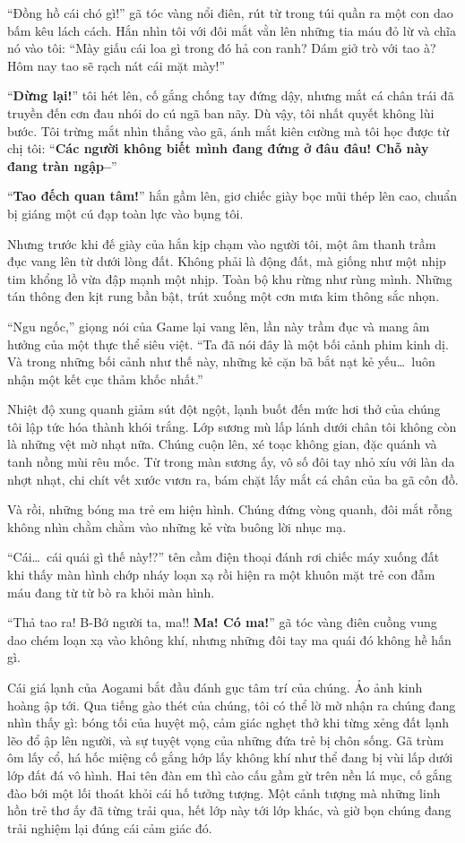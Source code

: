 \documentclass[../main.tex]{subfiles}
\begin{document}
``Đồng hồ cái chó gì!'' gã tóc vàng nổi điên, rút từ trong túi quần ra một con dao bấm kêu lách cách. Hắn nhìn tôi với đôi mắt vằn lên những tia máu đỏ lừ và chĩa nó vào tôi: ``Mày giấu cái loa gì trong đó hả con ranh? Dám giở trò với tao à? Hôm nay tao sẽ rạch nát cái mặt mày!''

``\textbf{Dừng lại!}'' tôi hét lên, cố gắng chống tay đứng dậy, nhưng mắt cá chân trái đã truyền đến cơn đau nhói do cú ngã ban nãy. Dù vậy, tôi nhất quyết không lùi bước. Tôi trừng mắt nhìn thẳng vào gã, ánh mắt kiên cường mà tôi học được từ chị tôi: ``\textbf{Các người không biết mình đang đứng ở đâu đâu! Chỗ này đang tràn ngập--}''

``\textbf{Tao đếch quan tâm!}'' hắn gầm lên, giơ chiếc giày bọc mũi thép lên cao, chuẩn bị giáng một cú đạp toàn lực vào bụng tôi.

Nhưng trước khi đế giày của hắn kịp chạm vào người tôi, một âm thanh trầm đục vang lên từ dưới lòng đất. Không phải là động đất, mà giống như một nhịp tim khổng lồ vừa đập mạnh một nhịp. Toàn bộ khu rừng như rùng mình. Những tán thông đen kịt rung bần bật, trút xuống một cơn mưa kim thông sắc nhọn.

``Ngu ngốc,'' giọng nói của Game lại vang lên, lần này trầm đục và mang âm hưởng của một thực thể siêu việt. ``Ta đã nói đây là một bối cảnh phim kinh dị. Và trong những bối cảnh như thế này, những kẻ cặn bã bắt nạt kẻ yếu\dots\ luôn nhận một kết cục thảm khốc nhất.''

Nhiệt độ xung quanh giảm sút đột ngột, lạnh buốt đến mức hơi thở của chúng tôi lập tức hóa thành khói trắng. Lớp sương mù lấp lánh dưới chân tôi không còn là những vệt mờ nhạt nữa. Chúng cuộn lên, xé toạc không gian, đặc quánh và tanh nồng mùi rêu mốc. Từ trong màn sương ấy, vô số đôi tay nhỏ xíu với làn da nhợt nhạt, chi chít vết xước vươn ra, bám chặt lấy mắt cá chân của ba gã côn đồ.

Và rồi, những bóng ma trẻ em hiện hình. Chúng đứng vòng quanh, đôi mắt rỗng không nhìn chằm chằm vào những kẻ vừa buông lời nhục mạ.

``Cái\dots\ cái quái gì thế này!?'' tên cầm điện thoại đánh rơi chiếc máy xuống đất khi thấy màn hình chớp nháy loạn xạ rồi hiện ra một khuôn mặt trẻ con đẫm máu đang từ từ bò ra khỏi màn hình.

``Thả tao ra! B-Bớ người ta, ma!! \textbf{Ma! Có ma!}'' gã tóc vàng điên cuồng vung dao chém loạn xạ vào không khí, nhưng những đôi tay ma quái đó không hề hấn gì.

Cái giá lạnh của Aogami bắt đầu đánh gục tâm trí của chúng. Ảo ảnh kinh hoàng ập tới. Qua tiếng gào thét của chúng, tôi có thể lờ mờ nhận ra chúng đang nhìn thấy gì: bóng tối của huyệt mộ, cảm giác nghẹt thở khi từng xẻng đất lạnh lẽo đổ ập lên người, và sự tuyệt vọng của những đứa trẻ bị chôn sống. Gã trùm ôm lấy cổ, há hốc miệng cố gắng hớp lấy không khí như thể đang bị vùi lấp dưới lớp đất đá vô hình. Hai tên đàn em thì cào cấu gầm gừ trên nền lá mục, cố gắng đào bới một lối thoát khỏi cái hố tưởng tượng. Một cảnh tượng mà những linh hồn trẻ thơ ấy đã từng trải qua, hết lớp này tới lớp khác, và giờ bọn chúng đang trải nghiệm lại đúng cái cảm giác đó.
\end{document}
